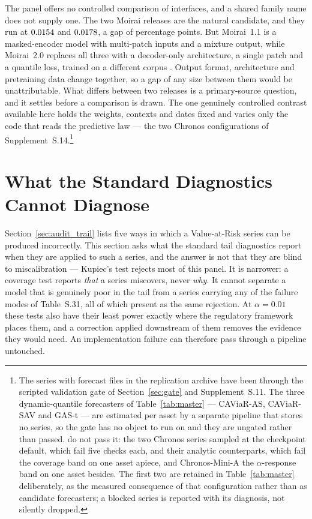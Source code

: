 \documentclass[preprint,11pt,authoryear]{elsarticle}
\newcommand{\1}{\boldsymbol{1}}
\begin{document}
The panel offers no controlled comparison of interfaces, and a shared family
name does not supply one. The two Moirai
releases are the natural candidate, and they run at $0.0154$ and
$0.0178$, a gap of \nLitMoiraiGapPP{} percentage points. But Moirai~1.1 is a
masked-encoder model with multi-patch inputs and a mixture output, while
Moirai~2.0 replaces all three with a decoder-only architecture, a single patch
and a quantile loss, trained on a different corpus
\citep{woo2024moirai,liu2025moirai}. Output format, architecture and pretraining
data change together, so a gap of any size between them would be unattributable.
What differs between two releases is a primary-source question, and it settles
before a comparison is drawn. The one genuinely controlled contrast
available here holds the weights, contexts and dates fixed and varies only the
code that reads the predictive law --- the two Chronos configurations of
Supplement~S.14.\footnote{The \nGateSeries{} series with forecast files in the replication
archive have been through the scripted validation gate of
Section~\ref{sec:gate} and Supplement~S.11. The three dynamic-quantile
forecasters of Table~\ref{tab:master} --- CAViaR-AS, CAViaR-SAV and GAS-t ---
are estimated per asset by a separate pipeline that stores no series, so the
gate has no object to run on and they are ungated rather than passed. \nGateBlocked{} do not pass it: the two Chronos series
sampled at the checkpoint default, which fail five checks each, and their
analytic counterparts, which fail the coverage band on one asset apiece, and
Chronos-Mini-A the $\alpha$-response band on one asset besides. The
first two are retained in Table~\ref{tab:master} deliberately, as the measured
consequence of that configuration rather than as candidate forecasters; a blocked series is
reported with its diagnosis, not silently dropped.}

\section{What the Standard Diagnostics Cannot Diagnose}
\label{sec:blindspot}

Section~\ref{sec:audit_trail} lists five ways in which a Value-at-Risk series can
be produced incorrectly. This section asks what the standard tail diagnostics
report when they are applied to such a series, and the answer is not that they
are blind to miscalibration --- Kupiec's test rejects most of this panel. It is
narrower: a coverage test reports \emph{that} a series miscovers, never
\emph{why}. It cannot separate a model that is genuinely poor in the tail from a
series carrying any of the failure modes of Table~S.31, all of
which present as the same rejection. At $\alpha = 0.01$ these tests also have
their least power exactly where the regulatory framework places them, and a
correction applied downstream of them removes the evidence they would need. An
implementation failure can therefore pass through a pipeline untouched.
\end{document}
